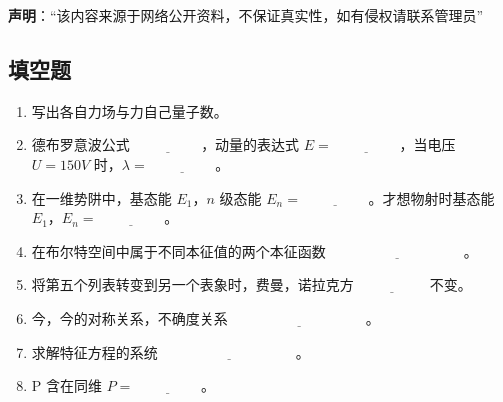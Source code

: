 
\textbf{声明}：“该内容来源于网络公开资料，不保证真实性，如有侵权请联系管理员”

\subsection{填空题}
\begin{enumerate}
    \item 写出各自力场与力自己量子数。
    \item 德布罗意波公式 $\underline{\hspace{2cm}}$，动量的表达式 $E = \underline{\hspace{2cm}}$，当电压 $U = 150V$ 时，$\lambda = \underline{\hspace{2cm}}$。
    \item 在一维势阱中，基态能 $E_1$，$n$ 级态能 $E_n = \underline{\hspace{2cm}}$。才想物射时基态能 $E_1$，$E_n = \underline{\hspace{2cm}}$。
    \item 在布尔特空间中属于不同本征值的两个本征函数 $\underline{\hspace{4cm}}$。
    \item 将第五个列表转变到另一个表象时，费曼，诺拉克方 $\underline{\hspace{2cm}}$ 不变。
    \item 今，今的对称关系，不确度关系 $\underline{\hspace{4cm}}$。
    \item 求解特征方程的系统 $\underline{\hspace{4cm}}$。
    \item P 含在同维 $P = \underline{\hspace{2cm}}$。
\end{enumerate}